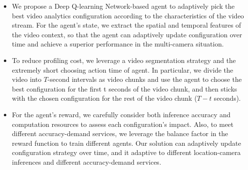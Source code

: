 \begin{itemize}	
	\item We propose a Deep Q-learning Network-based \cite{DQN} agent to adaptively pick the best video analytics configuration according to the characteristics of the video stream. For the agent's state, we extract the spatial and temporal features of the video context, so that the agent can adaptively update configuration over time and achieve a superior performance in the multi-camera situation. 
	
	\item To reduce profiling cost, we leverage a video segmentation strategy and the extremely short choosing action time of agent. In particular, we divide the video into $T$-second intervals as video chunks and use the agent to choose the best configuration for the first t seconds of the video chunk, and then sticks with the chosen configuration for the rest of the video chunk ($T-t$ seconds).
	
	\item For the agent's reward, we carefully consider both inference accuracy and computation resources to assess each configuration's impact. Also, to meet different accuracy-demand services, we leverage the balance factor in the reward function to train different agents. Our solution can adaptively update configuration strategy over time, and it adaptive to different location-camera inferences and different accuracy-demand services.

	
	

\end{itemize}
